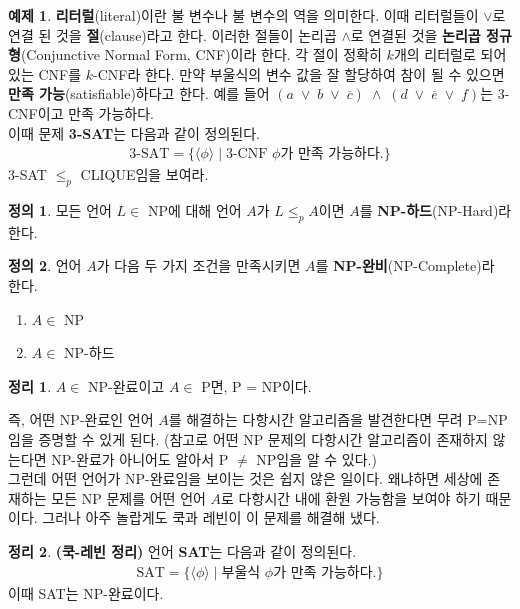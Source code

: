 \documentclass[b5paper]{book}
\theoremstyle{definition}
\newtheorem{defn}{정의}[chapter]
\newtheorem{thm}{정리}[chapter]
\newtheorem{ex}{예제}[chapter]
\begin{document}
\begin{ex}
    \textbf{리터럴}(literal)이란 불 변수나 불 변수의 역을 의미한다. 이때 리터럴들이 $\vee$로 연결 된 것을
    \textbf{절}(clause)라고 한다. 이러한 절들이 논리곱 $\wedge$로 연결된 것을 \textbf{논리곱 
    정규형}(Conjunctive Normal Form, CNF)이라 한다. 각 절이 정확히 $k$개의 리터럴로 되어 있는 CNF를
    $k$-CNF라 한다. 만약 부울식의 변수 값을 잘 할당하여 참이 될 수 있으면 
    \textbf{만족 가능}(satisfiable)하다고 
    한다. 예를 들어 $(a \; \vee\; b \;\vee\; \overline{c} ) \;\wedge\; (d \;\vee\; 
    \overline{e}\; \vee\; f)$는 
    3-CNF이고 만족 가능하다. \\ 
    이때 문제 \textbf{3-SAT}는 다음과 같이 정의된다. 
    \begin{align*}
        \text{3-SAT} = \{\langle \phi \rangle \;\vert\; \text{3-CNF }\phi\text{가 만족 가능하다.} \}
    \end{align*}   
    3-SAT $\le_p$ CLIQUE임을 보여라.
\end{ex}
\begin{defn}
    모든 언어 $L \in$ NP에 대해 언어 $A$가 $L \le_p A$이면 $A$를 \textbf{NP-하드}(NP-Hard)라 한다. 
\end{defn}
\begin{defn}
    언어 $A$가 다음 두 가지 조건을 만족시키면 $A$를 \textbf{NP-완비}(NP-Complete)라 한다.
    \begin{enumerate}
        \item $A \in$ NP
        \item $A \in$ NP-하드
    \end{enumerate}
\end{defn}
\begin{thm}
    $A \in$ NP-완료이고 $A \in$ P면, P = NP이다.
\end{thm}
즉, 어떤 NP-완료인 언어 $A$를 해결하는 다항시간 알고리즘을 발견한다면 
무려 P=NP임을 증명할 수 있게 된다. (참고로 어떤 NP 문제의 다항시간 알고리즘이 존재하지 않는다면 
NP-완료가 아니어도 알아서 P $\neq$ NP임을 알 수 있다.) \\ 
그런데 어떤 언어가 NP-완료임을 보이는 것은 쉽지 않은 일이다. 왜냐하면 세상에 존재하는 
모든 NP 문제를 어떤 언어 $A$로 다항시간 내에 환원 가능함을 보여야 하기 때문이다. 그러나 아주 놀랍게도 
쿡과 레빈이 이 문제를 해결해 냈다.
\begin{thm}
    \textbf{(쿡-레빈 정리)} 언어 \textbf{SAT}는 다음과 같이 정의된다.
    \begin{align*}
        \text{SAT} = \{\langle \phi \rangle \;\vert\; \text{부울식 } \phi \text{가 만족 가능하다.}\}
    \end{align*} 
    이때 SAT는 NP-완료이다.
\end{thm}
\end{document}
